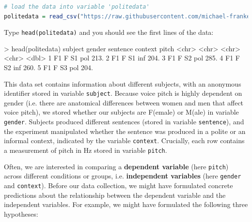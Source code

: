 \documentclass[nobib]{tufte-handout}
\newcommand{\ri}[1]{\lstinline{#1}}  %
\begin{document}
\medskip

\begin{minipage}[]{\textwidth}
\begin{lstlisting}[language=R]
# load the data into variable 'politedata'
politedata = read_csv("https://raw.githubusercontent.com/michael-franke/bayes_mixed_regression_tutorial/master/code/politeness_data.csv")
\end{lstlisting}
\end{minipage}

\vspace*{-0.5cm}

\noindent Type \ri{head(politedata)} and you should see the first lines of the
data:
%

\bigskip

\begin{minipage}[]{\textwidth}
\begin{rc}
> head(politedata)
   subject gender sentence context pitch
   <chr>   <chr>  <chr>    <chr>   <dbl>
 1 F1      F      S1       pol      213.
 2 F1      F      S1       inf      204.
 3 F1      F      S2       pol      285.
 4 F1      F      S2       inf      260.
 5 F1      F      S3       pol      204.
\end{rc}
\end{minipage}


\medskip

\noindent This data set contains information about different subjects, with an anonymous identifier stored in variable \texttt{subject}.
Because voice pitch is highly dependent on gender (i.e. there are anatomical differences between women and men that affect voice pitch), we stored whether our subjects are F(emale) or M(ale) in variable \texttt{gender}.
Subjects produced different sentences (stored in variable \texttt{sentence}), and the experiment manipulated whether the sentence was produced in a polite or an informal context, indicated by the variable \texttt{context}. Crucially, each row contains a measurement of pitch in Hz stored in variable \texttt{pitch}.

Often, we are interested in comparing a \textbf{dependent variable} (here \texttt{pitch})
across different conditions or groups, i.e. \textbf{independent variables} (here \texttt{gender} and \texttt{context}). Before our data collection,
we might have formulated concrete predictions about the relationship between the dependent
variable and the independent variables. For example, we might have formulated the following three
hypotheses:
\end{document}
